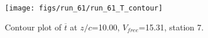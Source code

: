 \begin{figure}[H]
\centering
\texttt{[image: figs/run\_61/run\_61\_T\_contour]}
\caption{Contour plot of $\overline{t}$ at $z/c$=10.00, $V_{free}$=15.31, station 7.}
\end{figure}


